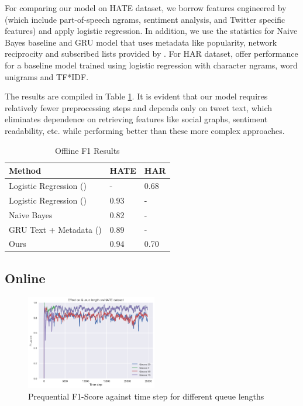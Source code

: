 \documentclass{article}
\begin{document}
  For comparing our model on HATE dataset, we borrow features engineered by \cite{hateoffensive} (which include part-of-speech ngrams, sentiment analysis, and Twitter specific features) and apply logistic regression. In addition, we use the statistics for
  Naive Bayes baseline and GRU model that uses metadata like popularity, network reciprocity and subscribed lists provided by \cite{founta2018unified}.
  For HAR dataset,
  \cite{kshirsagar2018predictive} offer performance for a baseline model trained using logistic regression with character ngrams, word unigrams and TF*IDF.

  The results are compiled in Table \ref{offline-res}. It is evident that our model requires relatively fewer preprocessing steps and depends only on tweet text, which eliminates dependence on
  retrieving features like social graphs, sentiment readability, etc. while performing better than these more complex approaches.

  \begin{table}
    \caption{Offline F1 Results}
    \label{offline-res}
    \centering
    \begin{tabular}{lll}
      \toprule
      Method     & HATE     & HAR \\
      \midrule
      Logistic Regression (\cite{kshirsagar2018predictive}) & - & 0.68\\
      Logistic Regression (\cite{hateoffensive}) & 0.93 & -\\
      Naive Bayes & 0.82 & -\\
      GRU Text + Metadata (\cite{founta2018unified}) & 0.89 & -\\
      Ours & 0.94 & 0.70\\
      \bottomrule
    \end{tabular}
  \end{table}

  \subsection{Online}
  \begin{figure}
    \begin{center}
    \includegraphics[width=2.25in]{Class_Imbalance_Result.png}
    \end{center}
    \caption{Prequential F1-Score against time step for different queue lengths}
    \label{fig:boat1}
  \end{figure}
\end{document}
